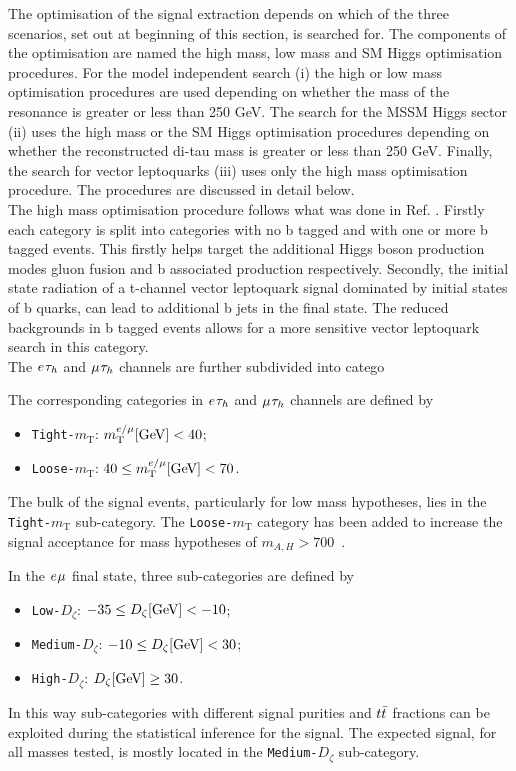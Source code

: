 The optimisation of the signal extraction depends on which of the three scenarios, set out at beginning of this section, is searched for.
The components of the optimisation are named the high mass, low mass and SM Higgs optimisation procedures.
For the model independent search (i) the high or low mass optimisation procedures are used depending on whether the mass of the resonance is greater or less than 250 GeV.
The search for the MSSM Higgs sector (ii) uses the high mass or the SM Higgs optimisation procedures depending on whether the reconstructed di-tau mass \cite{} is greater or less than 250 GeV.
Finally, the search for vector leptoquarks (iii) uses only the high mass optimisation procedure.
The procedures are discussed in detail below. \\

The high mass optimisation procedure follows what was done in Ref. \cite{}.
Firstly each category is split into categories with no b tagged and with one or more b tagged events.
This firstly helps target the additional Higgs boson production modes gluon fusion and b associated production respectively.
Secondly, the initial state radiation of a t-channel vector leptoquark signal dominated by initial states of b quarks, can lead to additional b jets in the final state.
The reduced backgrounds in b tagged events allows for a more sensitive vector leptoquark search in this category. \\

The $e_{}\tau_{h}$ and $\mu_{}\tau_{h}$ channels are further subdivided into catego


The corresponding categories in $e_{}\tau_{h}$ and $\mu_{}\tau_{h}$ channels are defined by
\begin{itemize}
\item \texttt{Tight-$m_{\text{T}}$}: $m_{\text{T}}^{e/\mu} [\text{GeV}] < 40$;
\item \texttt{Loose-$m_{\text{T}}$}: $40 \leq m_{\text{T}}^{e/\mu} [\text{GeV}] < 70$.
\end{itemize}
The bulk of the signal events, particularly for low mass hypotheses, lies in the \texttt{Tight-$m_{\text{T}}$} sub-category.
The \texttt{Loose-$m_{\text{T}}$} category has been added to increase the signal acceptance for mass hypotheses of $m_{A,H} > 700$~\GeV.

In the $e_{}\mu_{}$ final state, three sub-categories are defined by
\begin{itemize}
\item \texttt{Low-$D_\zeta$}: $-35 \leq D_\zeta [\text{GeV}] < -10$;
\item \texttt{Medium-$D_\zeta$}: $-10 \leq D_\zeta [\text{GeV}] <  30$;
\item \texttt{High-$D_\zeta$}: $D_\zeta [\text{GeV}] \geq 30$.
\end{itemize}
In this way sub-categories with different signal purities and $t\bar{t}$ fractions can be exploited during the statistical inference for the signal.
The expected signal, for all masses tested, is mostly located in the \texttt{Medium-$D_\zeta$} sub-category.

